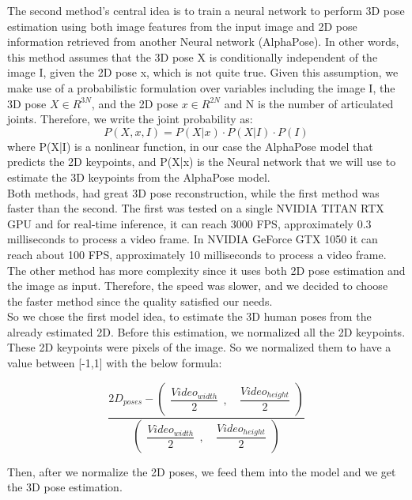 The second method's central idea \cite{3D Human Pose Estimation = 2D Pose Estimation + Matching} is to train a neural network to perform 3D pose estimation using both image features from the input image and 2D pose information retrieved from another Neural network (AlphaPose). In other words, this method assumes that the 3D pose X is conditionally independent of the image I, given the 2D pose x, which is not quite true. Given this assumption, we make use of a probabilistic formulation over variables including the image I, the 3D pose $X \in R^{3N}$, and the 2D pose $x \in R^{2N}$ and N is the number of articulated joints. Therefore, we write the joint probability as: 
$$P(X,x,I) = P(X|x) \cdot P(X|I) \cdot P(I)$$
where P(X|I) is a nonlinear function, in our case the AlphaPose model that
predicts the 2D keypoints, and P(X|x) is the Neural network that we will use to estimate the 3D keypoints from the AlphaPose model.\\

Both methods, had great 3D pose reconstruction, while the first method was faster than the second. The first was tested on a single NVIDIA TITAN RTX GPU and for real-time inference, it can reach 3000 FPS, approximately 0.3 milliseconds to process a video frame. In  NVIDIA GeForce GTX 1050 it can reach about 100 FPS, approximately 10 milliseconds to process a video frame. The other method has more complexity since it uses both 2D pose estimation and the image as input. Therefore, the speed was slower, and we decided to choose the faster method since the quality satisfied our needs.\\

So we chose the first model idea, to estimate the 3D human poses from the already estimated 2D. Before this estimation, we normalized all the 2D keypoints. These 2D keypoints were pixels of the image. So we normalized them to have a value between [-1,1] with the below formula:

$$\dfrac{2D_{poses} - \begin{pmatrix} \dfrac{Video_{width}}{2} \ \ ,& \ \dfrac{Video_{height}}{2} \end{pmatrix}}{\begin{pmatrix} \dfrac{Video_{width}}{2} \ \ ,& \ \dfrac{Video_{height}}{2} \end{pmatrix}}$$

Then, after we normalize the 2D poses, we feed them into the model and we get the 3D pose estimation.



